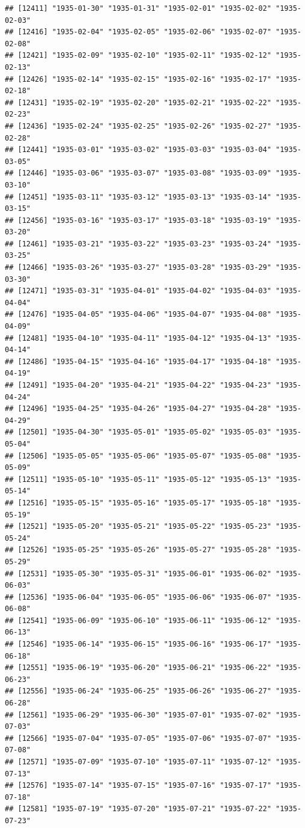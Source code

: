 \documentclass{article}\usepackage[]{graphicx}\usepackage[]{color}
\makeatletter
\newenvironment{kframe}{%
 \def\at@end@of@kframe{}%
 \ifinner\ifhmode%
  \def\at@end@of@kframe{\end{minipage}}%
  \begin{minipage}{\columnwidth}%
 \fi\fi%
 \def\FrameCommand##1{\hskip\@totalleftmargin \hskip-\fboxsep
 \colorbox{shadecolor}{##1}\hskip-\fboxsep
     \hskip-\linewidth \hskip-\@totalleftmargin \hskip\columnwidth}%
 \MakeFramed {\advance\hsize-\width
   \@totalleftmargin\z@ \linewidth\hsize
   \@setminipage}}%
 {\par\unskip\endMakeFramed%
 \at@end@of@kframe}
\newenvironment{knitrout}{}{} %
\makeatother
\begin{document}
\begin{description}
\begin{knitrout}
\begin{kframe}
\begin{verbatim}
## [12411] "1935-01-30" "1935-01-31" "1935-02-01" "1935-02-02" "1935-02-03"
## [12416] "1935-02-04" "1935-02-05" "1935-02-06" "1935-02-07" "1935-02-08"
## [12421] "1935-02-09" "1935-02-10" "1935-02-11" "1935-02-12" "1935-02-13"
## [12426] "1935-02-14" "1935-02-15" "1935-02-16" "1935-02-17" "1935-02-18"
## [12431] "1935-02-19" "1935-02-20" "1935-02-21" "1935-02-22" "1935-02-23"
## [12436] "1935-02-24" "1935-02-25" "1935-02-26" "1935-02-27" "1935-02-28"
## [12441] "1935-03-01" "1935-03-02" "1935-03-03" "1935-03-04" "1935-03-05"
## [12446] "1935-03-06" "1935-03-07" "1935-03-08" "1935-03-09" "1935-03-10"
## [12451] "1935-03-11" "1935-03-12" "1935-03-13" "1935-03-14" "1935-03-15"
## [12456] "1935-03-16" "1935-03-17" "1935-03-18" "1935-03-19" "1935-03-20"
## [12461] "1935-03-21" "1935-03-22" "1935-03-23" "1935-03-24" "1935-03-25"
## [12466] "1935-03-26" "1935-03-27" "1935-03-28" "1935-03-29" "1935-03-30"
## [12471] "1935-03-31" "1935-04-01" "1935-04-02" "1935-04-03" "1935-04-04"
## [12476] "1935-04-05" "1935-04-06" "1935-04-07" "1935-04-08" "1935-04-09"
## [12481] "1935-04-10" "1935-04-11" "1935-04-12" "1935-04-13" "1935-04-14"
## [12486] "1935-04-15" "1935-04-16" "1935-04-17" "1935-04-18" "1935-04-19"
## [12491] "1935-04-20" "1935-04-21" "1935-04-22" "1935-04-23" "1935-04-24"
## [12496] "1935-04-25" "1935-04-26" "1935-04-27" "1935-04-28" "1935-04-29"
## [12501] "1935-04-30" "1935-05-01" "1935-05-02" "1935-05-03" "1935-05-04"
## [12506] "1935-05-05" "1935-05-06" "1935-05-07" "1935-05-08" "1935-05-09"
## [12511] "1935-05-10" "1935-05-11" "1935-05-12" "1935-05-13" "1935-05-14"
## [12516] "1935-05-15" "1935-05-16" "1935-05-17" "1935-05-18" "1935-05-19"
## [12521] "1935-05-20" "1935-05-21" "1935-05-22" "1935-05-23" "1935-05-24"
## [12526] "1935-05-25" "1935-05-26" "1935-05-27" "1935-05-28" "1935-05-29"
## [12531] "1935-05-30" "1935-05-31" "1935-06-01" "1935-06-02" "1935-06-03"
## [12536] "1935-06-04" "1935-06-05" "1935-06-06" "1935-06-07" "1935-06-08"
## [12541] "1935-06-09" "1935-06-10" "1935-06-11" "1935-06-12" "1935-06-13"
## [12546] "1935-06-14" "1935-06-15" "1935-06-16" "1935-06-17" "1935-06-18"
## [12551] "1935-06-19" "1935-06-20" "1935-06-21" "1935-06-22" "1935-06-23"
## [12556] "1935-06-24" "1935-06-25" "1935-06-26" "1935-06-27" "1935-06-28"
## [12561] "1935-06-29" "1935-06-30" "1935-07-01" "1935-07-02" "1935-07-03"
## [12566] "1935-07-04" "1935-07-05" "1935-07-06" "1935-07-07" "1935-07-08"
## [12571] "1935-07-09" "1935-07-10" "1935-07-11" "1935-07-12" "1935-07-13"
## [12576] "1935-07-14" "1935-07-15" "1935-07-16" "1935-07-17" "1935-07-18"
## [12581] "1935-07-19" "1935-07-20" "1935-07-21" "1935-07-22" "1935-07-23"

\end{verbatim}
\end{kframe}
\end{knitrout}
\end{description}
\end{document}

